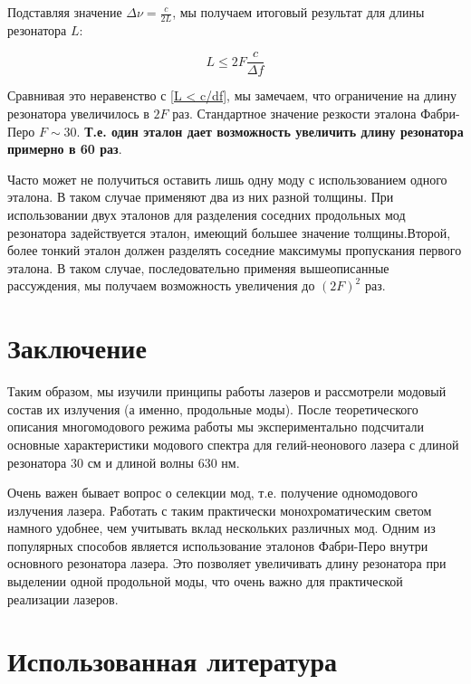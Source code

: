 \documentclass[12pt]{kiarticle}
\begin{document}
Подставляя значение $ \Delta \nu = \frac{c}{2L} $, мы получаем итоговый результат для длины резонатора $ L $:

\begin{equation}\label{}
L \leq 2F \dfrac{c}{\Delta f}
\end{equation}

Сравнивая это неравенство с \eqref{L < c/df}, мы замечаем, что ограничение на длину резонатора увеличилось в $ 2F $ раз. Стандартное значение резкости эталона Фабри-Перо $ F \sim 30 $. 
\textbf{Т.е. один эталон дает возможность увеличить длину резонатора примерно в 60 раз}. 

Часто может не получиться оставить лишь одну моду с использованием одного эталона. В таком случае применяют два из них разной толщины. При использовании двух эталонов для разделения соседних продольных мод резонатора задействуется эталон, имеющий большее значение толщины.Второй, более тонкий эталон должен разделять соседние максимумы пропускания первого эталона. В таком случае, последовательно применяя вышеописанные рассуждения, мы получаем возможность увеличения до $ (2F)^2 $ раз. 

\section{Заключение}

Таким образом, мы изучили принципы работы лазеров и рассмотрели модовый состав их излучения (а именно, продольные моды). После теоретического описания многомодового режима работы мы экспериментально подсчитали основные характеристики модового спектра для гелий-неонового лазера с длиной резонатора 30 см и длиной волны 630 нм. 

Очень важен бывает вопрос о селекции мод, т.е. получение одномодового излучения лазера. Работать с таким практически монохроматическим светом намного удобнее, чем учитывать вклад нескольких различных мод. 
Одним из популярных способов является использование эталонов Фабри-Перо внутри основного резонатора лазера. Это позволяет увеличивать длину резонатора при выделении одной продольной моды, что очень важно для практической реализации лазеров. 

\section*{Использованная литература}
\end{document}
